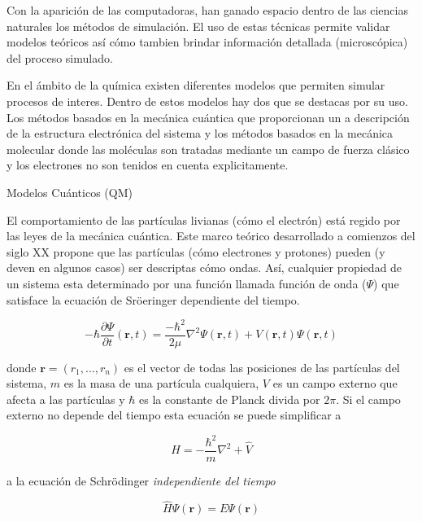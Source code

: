 Con la aparici\'on de las computadoras, han ganado espacio dentro de las ciencias naturales los m\'etodos de simulaci\'on.
El uso de estas t\'ecnicas permite validar modelos teóricos así cómo tambien brindar información detallada (microscópica) del proceso simulado.

En el ámbito de la química existen diferentes modelos que permiten simular procesos de interes.
Dentro de estos modelos hay dos que se destacas por su uso.
Los métodos basados en la mecánica cuántica que proporcionan un a descripción de la estructura electrónica del sistema y los métodos basados en la mecánica molecular donde las moléculas son tratadas mediante un campo de fuerza
clásico y los electrones no son tenidos en cuenta explicitamente.

Modelos Cuánticos (QM)

El comportamiento de las partículas livianas (cómo el electrón) está regido por las leyes de la mecánica cuántica.
Este marco teórico desarrollado a comienzos del siglo XX propone que las partículas (cómo electrones y protones) pueden (y deven en algunos casos) 
ser descriptas cómo ondas. Así, cualquier propiedad de un sistema esta determinado por una función llamada función de onda ($\Psi$) que satisface la ecuación de Sr\"oeringer dependiente del tiempo.

\begin{equation}
    \label{schro_time_dep}
    -\hbar\frac{\partial \Psi}{\partial t} (\mathbf{r},t) = \frac{-\hbar^2}{2\mu}\nabla^2 \Psi(\mathbf{r},t) + V(\mathbf{r},t) \Psi(\mathbf{r},t)
\end{equation}

donde $\mathbf{r} = (r_1,\dots,r_n)$ es el vector de todas las posiciones de las part\'iculas del sistema,
$m$ es la masa de una part\'icula cualquiera, $V$ es un campo externo que afecta a las part\'iculas y
$\hbar$ es la constante de Planck divida por $2\pi$. Si el campo externo no depende del tiempo esta ecuación se puede simplificar a 

\begin{equation*}
    \hat{H} =  -\frac{\hbar^2}{m} \nabla^2 + \hat{V}
\end{equation*}

a la ecuaci\'on de Schr\"odinger \textit{independiente del tiempo}

\begin{equation}
    \label{schro_time_indep}
    \hat{H} \Psi(\mathbf{r}) = E \Psi(\mathbf{r})
\end{equation}

